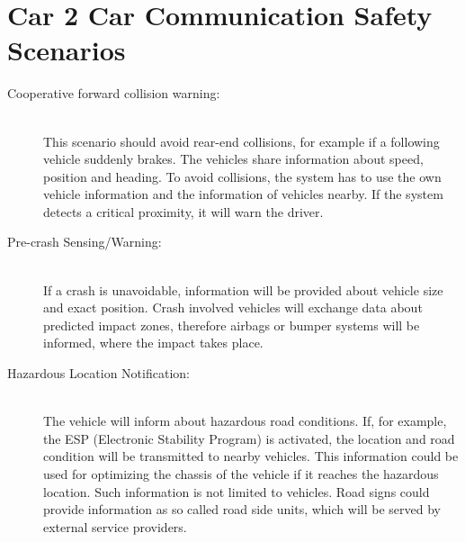 \section{Car 2 Car Communication Safety Scenarios}
\label{sec:C2CSafetyScenarios}
\begin{description}
  \item[Cooperative forward collision warning:] \hfill \\ This scenario should avoid rear-end collisions, for example if a following vehicle suddenly brakes. The vehicles share information about speed, position and heading. To avoid collisions, the system has to use the own vehicle information and the information of vehicles nearby. If the system detects a critical proximity, it will warn the driver.
  \item[Pre-crash Sensing/Warning:] \hfill \\ If a crash is unavoidable, information will be provided about vehicle size and exact position. Crash involved vehicles will exchange data about predicted impact zones, therefore airbags or bumper systems will be informed, where the impact takes place. 
  \item[Hazardous Location Notification:] \hfill \\ The vehicle will inform about hazardous road conditions. If, for example, the ESP (Electronic Stability Program) is activated, the location and road condition will be transmitted to nearby vehicles. This information could be used for optimizing the chassis of the vehicle if it reaches the hazardous location. Such information is not limited to vehicles. Road signs could provide information as so called road side units, which will be served by external service providers. 
\end{description}	

